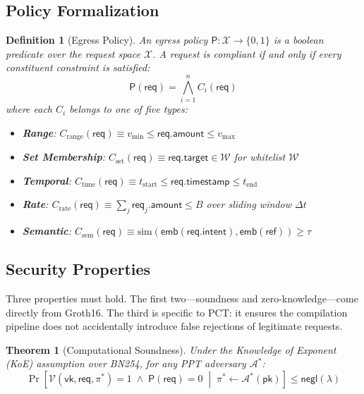 \documentclass[10pt,conference]{IEEEtran}
\newtheorem{theorem}{Theorem}
\newtheorem{definition}{Definition}
\begin{document}
\subsection{Policy Formalization}

\begin{definition}[Egress Policy]
\label{def:policy}
An egress policy $\mathsf{P}: \mathcal{X} \rightarrow \{0, 1\}$ is a boolean predicate over the request space $\mathcal{X}$. A request is compliant if and only if every constituent constraint is satisfied:
\[
\mathsf{P}(\mathsf{req}) = \bigwedge_{i=1}^{n} C_i(\mathsf{req})
\]
where each $C_i$ belongs to one of five types:
\begin{itemize}
    \item \textbf{Range}: $C_{\text{range}}(\mathsf{req}) \equiv v_{\min} \leq \mathsf{req}.\mathsf{amount} \leq v_{\max}$
    \item \textbf{Set Membership}: $C_{\text{set}}(\mathsf{req}) \equiv \mathsf{req}.\mathsf{target} \in \mathcal{W}$ for whitelist $\mathcal{W}$
    \item \textbf{Temporal}: $C_{\text{time}}(\mathsf{req}) \equiv t_{\text{start}} \leq \mathsf{req}.\mathsf{timestamp} \leq t_{\text{end}}$
    \item \textbf{Rate}: $C_{\text{rate}}(\mathsf{req}) \equiv \sum_{j} \mathsf{req}_j.\mathsf{amount} \leq B$ over sliding window $\Delta t$
    \item \textbf{Semantic}: $C_{\text{sem}}(\mathsf{req}) \equiv \text{sim}(\mathsf{emb}(\mathsf{req}.\mathsf{intent}), \mathsf{emb}(\mathsf{ref})) \geq \tau$
\end{itemize}
\end{definition}

\subsection{Security Properties}

Three properties must hold. The first two---soundness and zero-knowledge---come directly from Groth16. The third is specific to PCT: it ensures the compilation pipeline does not accidentally introduce false rejections of legitimate requests.

\begin{theorem}[Computational Soundness]
\label{thm:soundness}
Under the Knowledge of Exponent (KoE) assumption over BN254, for any PPT adversary $\mathcal{A}^*$:
\[
\Pr\left[\mathcal{V}(\mathsf{vk}, \mathsf{req}, \pi^*) = 1 \;\wedge\; \mathsf{P}(\mathsf{req}) = 0 \;\middle|\; \pi^* \leftarrow \mathcal{A}^*(\mathsf{pk})\right] \leq \textsf{negl}(\lambda)
\]
\end{theorem}
\end{document}
